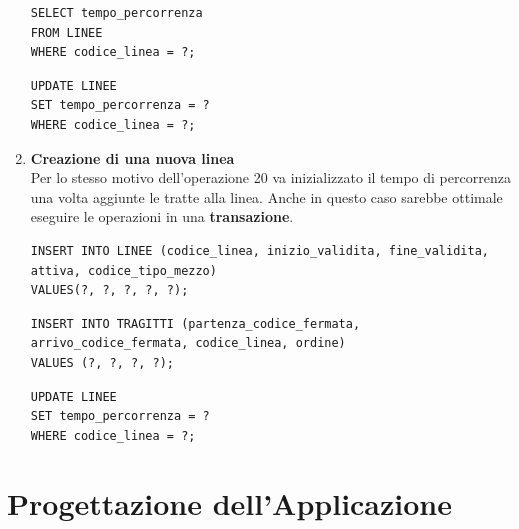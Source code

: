 \documentclass[12pt,a4paper]{report}
\begin{document}
\begin{enumerate}[label=\textbf{\arabic*)}]
\begin{lstlisting}[style=sqlstyle, caption=Lettura vecchio tempo di percorrenza]
SELECT tempo_percorrenza
FROM LINEE
WHERE codice_linea = ?;
\end{lstlisting}

\begin{lstlisting}[style=sqlstyle, caption=Aggiornamento del tempo di percorrenza]
UPDATE LINEE
SET tempo_percorrenza = ?
WHERE codice_linea = ?;
\end{lstlisting}

\item \textbf{Creazione di una nuova linea} \\
Per lo stesso motivo dell'operazione 20 va inizializzato il tempo di percorrenza una volta aggiunte le tratte alla linea. Anche in questo caso sarebbe ottimale eseguire le operazioni in una \textbf{transazione}.
\begin{lstlisting}[style=sqlstyle, caption=Inserimento linea]
INSERT INTO LINEE (codice_linea, inizio_validita, fine_validita, attiva, codice_tipo_mezzo)
VALUES(?, ?, ?, ?, ?);
\end{lstlisting}

\begin{lstlisting}[style=sqlstyle, caption=Inserimento tragitti \textit{Da ripetere n volte, con $n = num\_tragitti$}]
INSERT INTO TRAGITTI (partenza_codice_fermata, arrivo_codice_fermata, codice_linea, ordine)
VALUES (?, ?, ?, ?);
\end{lstlisting}
\begin{lstlisting}[style=sqlstyle, caption=Update tempo di percorrenza della linea]
UPDATE LINEE
SET tempo_percorrenza = ?
WHERE codice_linea = ?;
\end{lstlisting}

\end{enumerate}

\chapter{Progettazione dell'Applicazione}
\end{document}
